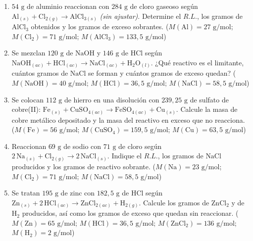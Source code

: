 \documentclass[12pt, letterpaper]{article}
\begin{document}
\begin{enumerate}[leftmargin=*, start=25]
  \item \dificil{}\hspace{0.55em}$54\text{ g}$ de aluminio reaccionan con $284\text{ g}$ de cloro gaseoso según $\text{Al}_{(s)} + \text{Cl}_{2(g)} \longrightarrow \text{AlCl}_{3(s)}$ \emph{(sin ajustar)}. Determine el $R.L.$, los gramos de $\text{AlCl}_3$ obtenidos y los gramos de exceso sobrantes. ($M(\text{Al}) = 27\text{ g/mol}$; $M(\text{Cl}_2) = 71\text{ g/mol}$; $M(\text{AlCl}_3) = 133{,}5\text{ g/mol}$)

  \item \dificil{}\hspace{0.55em}Se mezclan $120\text{ g}$ de $\text{NaOH}$ y $146\text{ g}$ de $\text{HCl}$ según $\text{NaOH}_{(ac)} + \text{HCl}_{(ac)} \longrightarrow \text{NaCl}_{(ac)} + \text{H}_2\text{O}_{(l)}$. ¿Qué reactivo es el limitante, cuántos gramos de $\text{NaCl}$ se forman y cuántos gramos de exceso quedan? ($M(\text{NaOH}) = 40\text{ g/mol}$; $M(\text{HCl}) = 36{,}5\text{ g/mol}$; $M(\text{NaCl}) = 58{,}5\text{ g/mol}$)

  \item \dificil{}\hspace{0.55em}Se colocan $112\text{ g}$ de hierro en una disolución con $239{,}25\text{ g}$ de sulfato de cobre(II): $\text{Fe}_{(s)} + \text{CuSO}_{4(ac)} \longrightarrow \text{FeSO}_{4(ac)} + \text{Cu}_{(s)}$. Calcule la masa de cobre metálico depositado y la masa del reactivo en exceso que no reacciona. ($M(\text{Fe}) = 56\text{ g/mol}$; $M(\text{CuSO}_4) = 159{,}5\text{ g/mol}$; $M(\text{Cu}) = 63{,}5\text{ g/mol}$)

  \item \dificil{}\hspace{0.55em}Reaccionan $69\text{ g}$ de sodio con $71\text{ g}$ de cloro según $2\,\text{Na}_{(s)} + \text{Cl}_{2(g)} \longrightarrow 2\,\text{NaCl}_{(s)}$. Indique el $R.L.$, los gramos de $\text{NaCl}$ producidos y los gramos de reactivo sobrante. ($M(\text{Na}) = 23\text{ g/mol}$; $M(\text{Cl}_2) = 71\text{ g/mol}$; $M(\text{NaCl}) = 58{,}5\text{ g/mol}$)

  \item \dificil{}\hspace{0.55em}Se tratan $195\text{ g}$ de zinc con $182{,}5\text{ g}$ de $\text{HCl}$ según $\text{Zn}_{(s)} + 2\,\text{HCl}_{(ac)} \longrightarrow \text{ZnCl}_{2(ac)} + \text{H}_{2(g)}$. Calcule los gramos de $\text{ZnCl}_2$ y de $\text{H}_2$ producidos, así como los gramos de exceso que quedan sin reaccionar. ($M(\text{Zn}) = 65\text{ g/mol}$; $M(\text{HCl}) = 36{,}5\text{ g/mol}$; $M(\text{ZnCl}_2) = 136\text{ g/mol}$; $M(\text{H}_2) = 2\text{ g/mol}$)


\end{enumerate}
\end{document}
